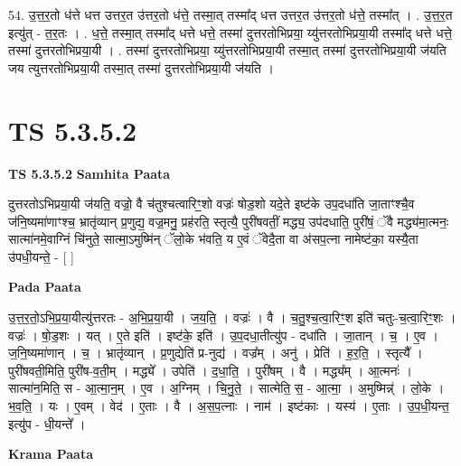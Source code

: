\documentclass[17pt]{extarticle}
\begin{document}
54. उ॒त्त॒र॒तो ध॑त्ते धत्त उत्तर॒त उ॑त्तर॒तो ध॑त्ते॒ तस्मा॒त् तस्मा᳚द् धत्त उत्तर॒त उ॑त्तर॒तो ध॑त्ते॒ तस्मा᳚त् । . उ॒त्त॒र॒त इत्यु॑त् - त॒र॒तः । . ध॒त्ते॒ तस्मा॒त् तस्मा᳚द् धत्ते धत्ते॒ तस्मा॑ दुत्तरतोभिप्रया॒ य्यु॑त्तरतोभिप्रया॒यी तस्मा᳚द् धत्ते धत्ते॒ तस्मा॑ दुत्तरतोभिप्रया॒यी । . तस्मा॑ दुत्तरतोभिप्रया॒ य्यु॑त्तरतोभिप्रया॒यी तस्मा॒त् तस्मा॑ दुत्तरतोभिप्रया॒यी ज॑यति जय त्युत्तरतोभिप्रया॒यी तस्मा॒त् तस्मा॑ दुत्तरतोभिप्रया॒यी ज॑यति । \newline
\pagebreak
{}

\section{ TS 5.3.5.2 }

\textbf{TS 5.3.5.2 } \newline
\textbf{Samhita Paata} \newline

दुत्तरतोऽभिप्रया॒यी ज॑यति॒ वज्रो॒ वै च॑तुश्चत्वारिꣳ॒॒शो वज्रः॑ षोड॒शो यदे॒ते इष्ट॑के उप॒दधा॑ति जा॒ताꣳश्चै॒व ज॑नि॒ष्यमा॑णाꣳश्च॒ भ्रातृ॑व्यान् प्र॒णुद्य॒ वज्र॒मनु॒ प्रह॑रति॒ स्तृत्यै॒ पुरी॑षवतीं॒ मद्ध्य॒ उप॑दधाति॒ पुरी॑षं॒ ॅवै मद्ध्य॑मा॒त्मनः॒ सात्मा॑नमे॒वाग्निं चि॑नुते॒ सात्मा॒ऽमुष्मि॑न् ॅलो॒के भ॑वति॒ य ए॒वं ॅवेदै॒ता वा अ॑सप॒त्ना नामेष्ट॑का॒ यस्यै॒ता उ॑पधी॒यन्ते॒ - [  ] \newline

\textbf{Pada Paata} \newline

उ॒त्त॒र॒तो॒ऽभि॒प्र॒या॒यीत्यु॑त्तरतः - अ॒भि॒प्र॒या॒यी । ज॒य॒ति॒ । वज्रः॑ । वै । च॒तु॒श्च॒त्वा॒रिꣳ॒॒श इति॑ चतुः-च॒त्वा॒रिꣳ॒॒शः । वज्रः॑ । षो॒ड॒शः । यत् । ए॒ते इति॑ । इष्ट॑के॒ इति॑ । उ॒प॒दधा॒तीत्यु॑प - दधा॑ति । जा॒तान् । च॒ । ए॒व । ज॒नि॒ष्यमा॑णान् । च॒ । भ्रातृ॑व्यान् । प्र॒णुद्येति॑ प्र-नुद्य॑ । वज्र᳚म् । अनु॑ । प्रेति॑ । ह॒र॒ति॒ । स्तृत्यै᳚ । पुरी॑षवती॒मिति॒ पुरी॑ष-व॒ती॒म् । मद्ध्ये᳚ । उपेति॑ । द॒धा॒ति॒ । पुरी॑षम् । वै । मद्ध्य᳚म् । आ॒त्मनः॑ । सात्मा॑न॒मिति॒ स - आ॒त्मा॒न॒म् । ए॒व । अ॒ग्निम् । चि॒नु॒ते॒ । सात्मेति॒ स॒ - आ॒त्मा॒ । अ॒मुष्मिन्न्॑ । लो॒के । भ॒व॒ति॒ । यः । ए॒वम् । वेद॑ । ए॒ताः । वै । अ॒स॒प॒त्नाः । नाम॑ । इष्ट॑काः । यस्य॑ । ए॒ताः । उ॒प॒धी॒यन्त॒ इत्यु॑प - धी॒यन्ते᳚ ।  \newline


\textbf{Krama Paata} \newline
\end{document}
